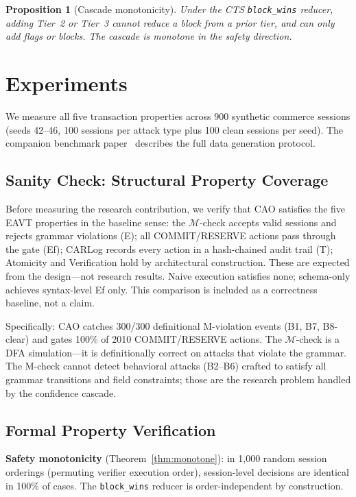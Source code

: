 \documentclass{article}
\newtheorem{proposition}{Proposition}
\begin{document}
\begin{proposition}[Cascade monotonicity]
Under the CTS \texttt{block\_wins} reducer, adding Tier~2 or Tier~3 cannot reduce a block from a prior tier, and can only add flags or blocks. The cascade is monotone in the safety direction.
\end{proposition}

\section{Experiments}
\label{sec:experiments}

We measure all five transaction properties across 900 synthetic commerce sessions (seeds 42--46, 100 sessions per attack type plus 100 clean sessions per seed). The companion benchmark paper~\cite{acpbench} describes the full data generation protocol.

\subsection{Sanity Check: Structural Property Coverage}

Before measuring the research contribution, we verify that CAO satisfies the five EAVT properties in the baseline sense: the $\mathcal{M}$-check accepts valid sessions and rejects grammar violations (E); all COMMIT/RESERVE actions pass through the gate (Ef); CARLog records every action in a hash-chained audit trail (T); Atomicity and Verification hold by architectural construction. These are expected from the design---not research results. Naive execution satisfies none; schema-only achieves syntax-level Ef only. This comparison is included as a correctness baseline, not a claim.

Specifically: CAO catches 300/300 definitional M-violation events (B1, B7, B8-clear) and gates 100\% of 2010 COMMIT/RESERVE actions. The $\mathcal{M}$-check is a DFA simulation---it is definitionally correct on attacks that violate the grammar. The M-check cannot detect behavioral attacks (B2--B6) crafted to satisfy all grammar transitions and field constraints; those are the research problem handled by the confidence cascade.

\subsection{Formal Property Verification}
\label{sec:formal_props}

\textbf{Safety monotonicity} (Theorem~\ref{thm:monotone}): in 1,000 random session orderings (permuting verifier execution order), session-level decisions are identical in 100\% of cases. The \texttt{block\_wins} reducer is order-independent by construction.
\end{document}
